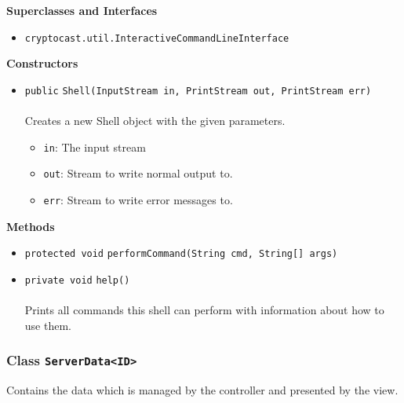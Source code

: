 \textbf{\sffamily Superclasses and Interfaces}
\begin{itemize}
\item \lstinline|cryptocast.util.InteractiveCommandLineInterface|
\end{itemize}


\textbf{\sffamily Constructors}
\begin{itemize}
\item \lstinline|public| \lstinline|Shell|\lstinline|(InputStream in, PrintStream out, PrintStream err)|\\ \\[-0.6em]
Creates a new Shell object with the given parameters.
\begin{itemize}
\item \lstinline|in|: The input stream
\item \lstinline|out|: Stream to write normal output to.
\item \lstinline|err|: Stream to write error messages to.
\end{itemize}



\end{itemize}


\textbf{\sffamily Methods}
\begin{itemize}
\item \lstinline|protected void| \lstinline|performCommand|\lstinline|(String cmd, String[] args)| \\[-0.6em]




\item \lstinline|private void| \lstinline|help|\lstinline|()|\\ \\[-0.6em]
Prints all commands this shell can perform with information about how to use them.



\end{itemize}

\subsubsection{Class \lstinline|ServerData<ID>|}
Contains the data which is managed by the controller and presented by the view. \\
\noindent\begin{minipage}[t]{5cm}
\vspace{0.3em}
\hspace*{2em}
\vspace{0.3em}
\end{minipage}

